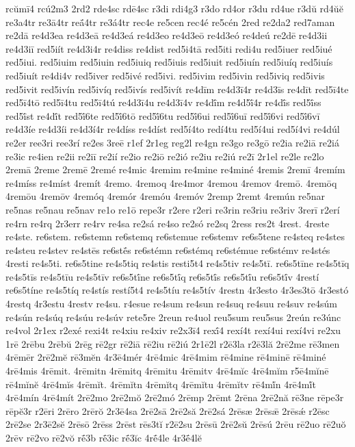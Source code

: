 {rcŭmī4
rcú2m3
2rd2
rde4sc
rdē4sc
r3di
rdi4g3
r3do
rd4or
r3du
rd4ue
r3dŭ
rd4ŭĕ
re3a4tr
re3ā4tr
reā́4tr
re3á4tr
rec4e
re5cen
rec4é
re5cén
2red
re2da2
red7aman
re2dā
re4d3ea
re4d3eā
re4d3eá
re4d3eo
re4d3eō
re4d3eó
re4deú
re2dē
re4d3ii
re4d3iī
red5iít
re4d3i4r
re4diss
re4dist
red5i4tā
red5iti
redi4u
red5iuer
red5iué
red5iui.
red5iuim
red5iuin
red5iuiq
red5iuis
red5iuit
red5iuín
red5iuíq
red5iuís
red5iuít
re4di4v
red5iver
red5ivé
red5ivi.
red5ivim
red5ivin
red5iviq
red5ivis
red5ivit
red5ivín
red5ivíq
red5ivís
red5ivít
re4dīm
re4d3ī4r
re4d3īs
re4dīt
red5ī4te
red5ī4tō
red5ī4tu
red5ī4tú
re4d3ī4u
re4d3ī4v
re4dī́m
re4d5ī́4r
re4dī́s
red5ī́ss
red5ī́st
re4dī́t
red5ī́6te
red5ī́6tō
red5ī́6tu
red5ī́6ui
red5ī́6uī
red5ī́6vi
red5ī́6vī
re4d3íe
re4d3íi
re4d3í4r
re4díss
re4díst
red5í4to
redí4tu
red5í4ui
red5í4vi
re4dúl
re2er
ree3ri
ree3rí
re2es
3reē
r1ef
2r1eg
reg2l
re4gn
re3go
re3gō
re2ia
re2iā
re2iá
re3ic
re4ien
re2ii
re2iī
re2ií
re2io
re2iō
re2ió
re2iu
re2iú
re2ī
2r1el
re2le
re2lo
2remā
2reme
2remē
2remé
re4mic
4remim
re4mine
re4miné
4remis
2remī
4remím
re4míss
re4míst
4remít
4remo.
4remoq
4re4mor
4remou
4remov
4remō.
4remōq
4remōu
4remōv
4remóq
4remór
4remóu
4remóv
2remp
2remt
4remún
re5nar
re5nas
re5nau
re5nav
re1o
re1ō
repe3r
r2ere
r2eri
re3rin
re3riu
re3riv
3rerī
r2erí
re4rn
re4rq
2r3err
re4rv
re4sa
re2sá
re4so
re2só
re2sq
2ress
res2t
4rest.
4reste
re4ste.
re6stem.
re6stemn
re6stemq
re6stemue
re6stemv
re6s5tene
re4steq
re4stes
re4steu
re4stev
re4stēs
re6stḗs
re6stémn
re6stémq
re6stémue
re6stémv
re4stés
4resti
re4s5ti.
re6s5tine
re4s5tiq
re4stis
resti5t4
re4s5tiv
re4s5tī.
re6s5tīne
re4s5tīq
re4s5tīs
re4s5tīu
re4s5tīv
re6s5tī́ne
re6s5tī́q
re6s5tī́s
re6s5tī́u
re6s5tī́v
4restí
re6s5tíne
re4s5tíq
re4stís
restí5t4
re4s5tíu
re4s5tív
4restn
4r3esto
4r3es3tō
4r3estó
4restq
4r3estu
4restv
re4su.
r4esue
re4sum
re4sun
re4suq
re4suu
re4suv
re4súm
re4sún
re4súq
re4súu
re4súv
rete5re
2reun
re4uol
reu5sum
reu5sus
2reún
re3únc
re4vol
2r1ex
r2exé
rexi4t
re4xiu
re4xiv
re2x3ī4
rexī́4
rexí4t
rexí4ui
rexí4vi
re2xu
1rē
2rēbu
2rēbŭ
2rēg
rē2gr
rē2iā
rē2iu
rē2iú
2r1ē2l
r2ē3la
r2ē3lă
2rē2me
rē3men
4rēmēr
2rē2mĕ
rē3mĕn
4r3ē4mér
4rē4mic
4rē4mim
rē4mine
rē4minē
rē4miné
4rē4mis
4rēmit.
4rēmitn
4rēmitq
4rēmitu
4rēmitv
4rē4mĭc
4rē4mĭm
r5ē4mĭnē
rē4mĭnĕ
4rē4mĭs
4rēmĭt.
4rēmĭtn
4rēmĭtq
4rēmĭtu
4rēmĭtv
rē4mĭ́n
4rē4mĭ́t
4rē4mín
4rē4mít
2rē2mo
2rē2mŏ
2rē2mó
2rēmp
2rēmt
2rēna
2rē2nă
rē3ne
rēpe3r
rēpĕ3r
r2ēri
2rēro
2rērŏ
2r3ē4sa
2rē2sā
2rē2să
2rē2sá
2rēsæ
2rēsǣ
2rēsǽ
r2ēsc
2rē2se
2r3ē2sĕ
2rēsō
2rēss
2rēst
rēs3tĭ
r2ē2su
2rēsū
2rē2sŭ
2rēsú
2rēu
rē2uo
rē2uŏ
2rēv
rē2vo
rē2vŏ
rḗ3b
rḗ3ic
rḗ3ĭc
4rḗ4le
4r3ḗ4lĕ
}
